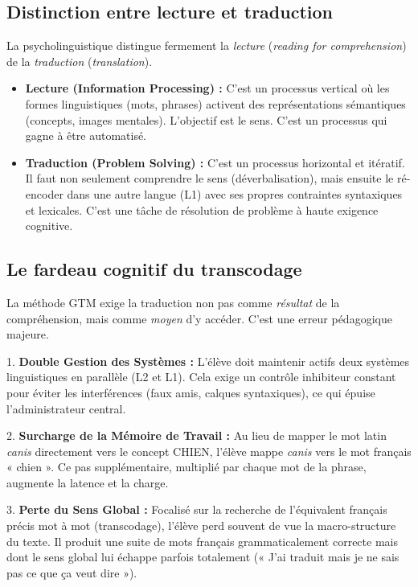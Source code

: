\subsection{Distinction entre lecture et traduction}

La psycholinguistique distingue fermement la \textit{lecture} (\textit{reading for comprehension})
de la \textit{traduction} (\textit{translation}).

\begin{itemize}\item \textbf{Lecture (Information Processing) :} C'est un processus vertical où les formes linguistiques (mots, phrases) activent des représentations sémantiques (concepts, images mentales). L'objectif est le sens. C'est un processus qui gagne à être automatisé.\cite{II-1-3-ref12}\item \textbf{Traduction (Problem Solving) :} C'est un processus horizontal et itératif. Il faut non seulement comprendre le sens (déverbalisation), mais ensuite le ré-encoder dans une autre langue (L1) avec ses propres contraintes syntaxiques et lexicales. C'est une tâche de \og résolution de problème\fg{} à haute exigence cognitive.\cite{II-1-3-ref31}\end{itemize}

\subsection{Le fardeau cognitif du transcodage}

La méthode GTM exige la traduction non pas comme \textit{résultat} de la compréhension, mais comme
\textit{moyen} d'y accéder. C'est une erreur pédagogique majeure.

1. \textbf{Double Gestion des Systèmes :} L'élève doit maintenir actifs deux systèmes linguistiques
en parallèle (L2 et L1). Cela exige un contrôle inhibiteur constant pour éviter les interférences
(faux amis, calques syntaxiques), ce qui épuise l'administrateur central.\cite{II-1-3-ref33}

2. \textbf{Surcharge de la Mémoire de Travail :} Au lieu de mapper le mot latin \textit{canis}
directement vers le concept {CHIEN}, l'élève mappe \textit{canis} vers le mot français « chien ». Ce
pas supplémentaire, multiplié par chaque mot de la phrase, augmente la latence et la charge.

3. \textbf{Perte du Sens Global :} Focalisé sur la recherche de l'équivalent français précis mot à
mot (transcodage), l'élève perd souvent de vue la macro-structure du texte. Il produit une suite de
mots français grammaticalement correcte mais dont le sens global lui échappe parfois totalement («
J'ai traduit mais je ne sais pas ce que ça veut dire »).\cite{II-1-3-ref4}



